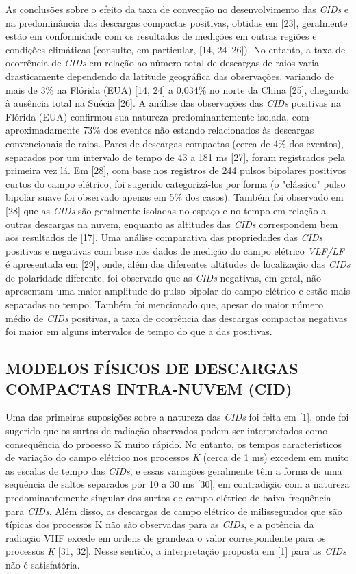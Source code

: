 \documentclass[a4paper, 12pt, onecolumn,singlespacing]{article}
\begin{document}
	As conclusões sobre o efeito da taxa de convecção no desenvolvimento das \textit{CIDs} e na predominância das descargas compactas positivas, obtidas em [23], geralmente estão em conformidade com os resultados de medições em outras regiões e condições climáticas (consulte, em particular, [14, 24–26]). No entanto, a taxa de ocorrência de \textit{CIDs} em relação ao número total de descargas de raios varia drasticamente dependendo da latitude geográfica das observações, variando de mais de 3\% na Flórida (EUA) [14, 24] a 0,034\% no norte da China [25], chegando à ausência total na Suécia [26]. A análise das observações das \textit{CIDs} positivas na Flórida (EUA) confirmou sua natureza predominantemente isolada, com aproximadamente 73\% dos eventos não estando relacionados às descargas convencionais de raios. Pares de descargas compactas (cerca de 4\% dos eventos), separados por um intervalo de tempo de 43 a 181 ms [27], foram registrados pela primeira vez lá. Em [28], com base nos registros de 244 pulsos bipolares positivos curtos do campo elétrico, foi sugerido categorizá-los por forma (o "clássico" pulso bipolar suave foi observado apenas em 5\% dos casos). Também foi observado em [28] que as \textit{CIDs} são geralmente isoladas no espaço e no tempo em relação a outras descargas na nuvem, enquanto as altitudes das \textit{CIDs} correspondem bem aos resultados de [17]. Uma análise comparativa das propriedades das \textit{CIDs} positivas e negativas com base nos dados de medição do campo elétrico \textit{VLF/LF} é apresentada em [29], onde, além das diferentes altitudes de localização das \textit{CIDs} de polaridade diferente, foi observado que as \textit{CIDs} negativas, em geral, não apresentam uma maior amplitude do pulso bipolar do campo elétrico e estão mais separadas no tempo. Também foi mencionado que, apesar do maior número médio de \textit{CIDs} positivas, a taxa de ocorrência das descargas compactas negativas foi maior em alguns intervalos de tempo do que a das positivas.
	
	\subsection{MODELOS FÍSICOS DE DESCARGAS COMPACTAS INTRA-NUVEM (CID)}
	
	Uma das primeiras suposições sobre a natureza das \textit{CIDs} foi feita em [1], onde foi sugerido que os surtos de radiação observados podem ser interpretados como consequência do processo K muito rápido. No entanto, os tempos característicos de variação do campo elétrico nos processos \textit{K} (cerca de 1 ms) excedem em muito as escalas de tempo das \textit{CIDs}, e essas variações geralmente têm a forma de uma sequência de saltos separados por 10 a 30 ms [30], em contradição com a natureza predominantemente singular dos surtos de campo elétrico de baixa frequência para \textit{CIDs}. Além disso, as descargas de campo elétrico de milissegundos que são típicas dos processos K não são observadas para as \textit{CIDs}, e a potência da radiação VHF excede em ordens de grandeza o valor correspondente para os processos \textit{K} [31, 32]. Nesse sentido, a interpretação proposta em [1] para as \textit{CIDs} não é satisfatória.
	
\end{document}
